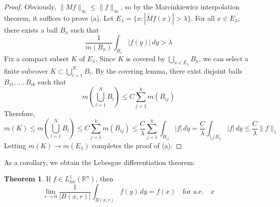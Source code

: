 \documentclass[12pt,openany]{book}
\theoremstyle{definition}
\newtheorem{theorem}{Theorem}[section]
\begin{document}
\begin{proof}
    Obviously, $\|M f\|_\infty \leq \|f\|_\infty$, so by the Marcinkiewicz interpolation theorem, it suffices to prove (a).
Let $E_\lambda = \{x : |\tilde{M} f(x)| > \lambda\}$. For all $x \in E_\lambda$, there exists a ball $B_x$ such that
$$
\frac{1}{m(B_x)} \int_{B_x} |f(y)| \, dy > \lambda
$$
Fix a compact subset $K$ of $E_\lambda$. Since $K$ is covered by $\bigcup_{x \in E_\lambda} B_x$, we can select a finite subcover $K \subset \bigcup_{l=1}^N B_l$. By the covering lemma, there exist disjoint balls $B_{i1}, \ldots, B_{ik}$ such that
$$
m\left(\bigcup_{l=1}^N B_l\right) \leq C \sum_{j=1}^k m(B_{ij})
$$
Therefore,
$$
m(K) \leq m\left(\bigcup_{l=1}^N B_l\right) \leq C \sum_{j=1}^k m(B_{ij}) \leq \frac{C}{\lambda} \sum_{j=1}^k \int_{B_{ij}} |f| \, dy = \frac{C}{\lambda} \int_{\bigcup B_{ij}} |f| \, dy \leq \frac{C}{\lambda} \|f\|_1
$$
Letting $m(K) \to m(E_\lambda)$ completes the proof of (a).
\end{proof} 

As a corollary, we obtain the Lebesgue differentiation theorem:
\begin{theorem}
    If $f \in L_{loc}^1(\mathbb{R}^n)$, then
$$
\lim_{r \to 0} \frac{1}{|B(x, r)|} \int_{B(x, r)} f(y) \, dy = f(x) \quad \text{for a.e.} \quad x
$$
\end{theorem}
\end{document}
